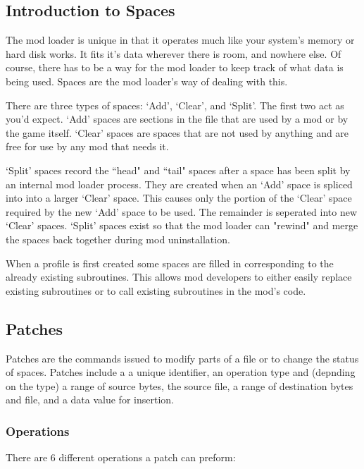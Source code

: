 \documentclass[12pt,a4paper,notitlepage]{article}
\begin{document}
\subsection{Introduction to Spaces}
\label{subsec:works-spaces}
The mod loader is unique in that it operates much like your system's memory or hard disk works. It fits it's data wherever there is room, and nowhere else. Of course, there has to be a way for the mod loader to keep track of what data is being used. Spaces are the mod loader's way of dealing with this.

There are three types of spaces: `Add', `Clear', and `Split'. The first two act as you'd expect. `Add' spaces are sections in the file that are used by a mod or by the game itself. `Clear' spaces are spaces that are not used by anything and are free for use by any mod that needs it. 

`Split' spaces record the ``head" and ``tail" spaces after a space has been split by an internal mod loader process. They are created when an `Add' space is spliced into into a larger `Clear' space. This causes only the portion of the `Clear' space required by the new `Add' space to be used. The remainder is seperated into new `Clear' spaces. `Split' spaces exist so that the mod loader can "rewind" and merge the spaces back together during mod uninstallation.

When a profile is first created some spaces are filled in corresponding to the already existing subroutines. This allows mod developers to either easily replace existing subroutines or to call existing subroutines in the mod's code.

\subsection{Patches}
\label{subsec:works-patch}
Patches are the commands issued to modify parts of a file or to change the status of spaces. Patches include a a unique identifier, an operation type and (depnding on the type) a range of source bytes, the source file, a range of destination bytes and file, and a data value for insertion.

\subsubsection{Operations}
\label{subsubsec:works-patch-op}
There are 6 different operations a patch can preform: 
\end{document}
